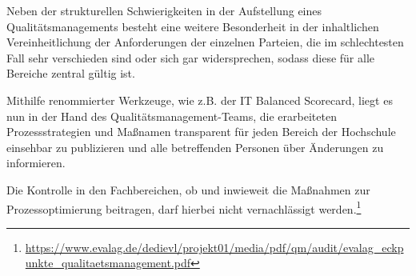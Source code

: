 Neben der strukturellen Schwierigkeiten in der Aufstellung eines Qualitätsmanagements besteht eine weitere Besonderheit in der inhaltlichen Vereinheitlichung der Anforderungen der einzelnen Parteien, die im schlechtesten Fall sehr verschieden sind oder sich gar widersprechen, sodass diese für alle Bereiche zentral gültig ist. 

Mithilfe renommierter Werkzeuge, wie z.B. der IT Balanced Scorecard, liegt es nun in der Hand des Qualitätsmanagement-Teams, 
die erarbeiteten Prozessstrategien und Maßnamen transparent für jeden Bereich der Hochschule einsehbar zu publizieren und 
alle betreffenden Personen über Änderungen zu informieren. 

Die Kontrolle in den Fachbereichen, ob und inwieweit die 
Maßnahmen zur Prozessoptimierung beitragen, darf hierbei nicht vernachlässigt werden.\footnote{\url{https://www.evalag.de/dedievl/projekt01/media/pdf/qm/audit/evalag_eckpunkte_qualitaetsmanagement.pdf}}

